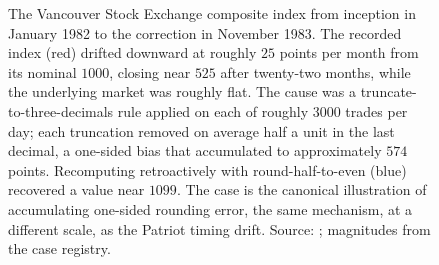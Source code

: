 \begin{figure}[ht]
\centering
{}
\caption[Vancouver Stock Exchange index drift]{The Vancouver Stock
Exchange composite index from inception in January 1982 to the
correction in November 1983. The recorded index (red) drifted downward
at roughly $25$ points per month from its nominal $1000$, closing near
$525$ after twenty-two months, while the underlying market was roughly
flat. The cause was a truncate-to-three-decimals rule applied on each of
roughly $3000$ trades per day; each truncation removed on average half a
unit in the last decimal, a one-sided bias that accumulated to
approximately $574$ points. Recomputing retroactively with
round-half-to-even (blue) recovered a value near $1099$. The case is the
canonical illustration of accumulating one-sided rounding error, the
same mechanism, at a different scale, as the Patriot timing drift.
Source: \cite{paper:quinn-vse-1983}; magnitudes from the case registry.}
\label{fig:vol02:ch16:vse-drift}
\end{figure}
